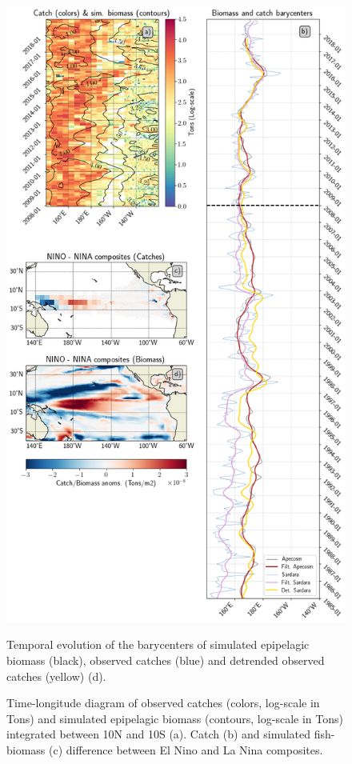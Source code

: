 \begin{figure}[h!tp]
	\centering
	\includegraphics[scale=0.35]{figs/plot_validation_apecosm.png}
	\caption{Time-longitude diagram of observed catches (colors, log-scale in Tons) and simulated epipelagic biomass (contours, log-scale in Tons) integrated between 10N and 10S (a). Catch (b) and simulated fish-biomass (c) difference between El Nino and La Nina composites.}Temporal evolution of the barycenters of simulated epipelagic biomass (black), observed catches (blue) and detrended observed catches (yellow) (d). 
	\label{fig:apecosm_validation}
\end{figure}


